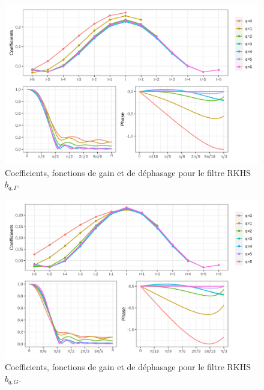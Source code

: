 \documentclass[
  12pt,
  a4paper,french]{article}
\newcommand\1{\mathds{1}}
\begin{document}
\begin{figure}[H]

{\centering \includegraphics[width=1\linewidth]{img/filters_used/frf} 

}

\caption[Coefficients, fonctions de gain et de déphasage pour le filtre RKHS \(b_{q,\Gamma}\)]{Coefficients, fonctions de gain et de déphasage pour le filtre RKHS \(b_{q,\Gamma}\).}\label{fig:graphsrkhsfrf}

\footnotesize
\normalsize\end{figure}

\begin{figure}[H]

{\centering \includegraphics[width=1\linewidth]{img/filters_used/gain} 

}

\caption[Coefficients, fonctions de gain et de déphasage pour le filtre RKHS \(b_{q,G}\)]{Coefficients, fonctions de gain et de déphasage pour le filtre RKHS \(b_{q,G}\).}\label{fig:graphsrkhsgain}

\footnotesize
\normalsize\end{figure}
\end{document}
